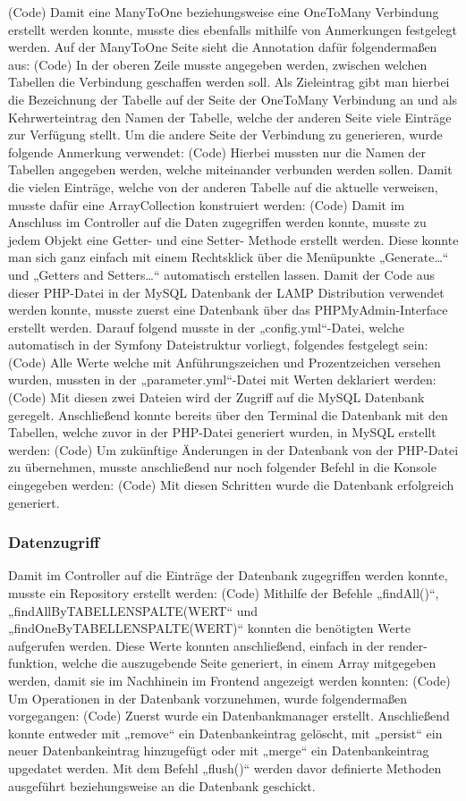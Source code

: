 	(Code)
	Damit eine ManyToOne beziehungsweise eine OneToMany Verbindung erstellt werden konnte, musste dies ebenfalls mithilfe von Anmerkungen festgelegt werden.
	Auf der ManyToOne Seite sieht die Annotation dafür folgendermaßen aus:
	(Code)
	In der oberen Zeile musste angegeben werden, zwischen welchen Tabellen die Verbindung geschaffen werden soll. Als Zieleintrag gibt man hierbei die Bezeichnung der Tabelle auf der Seite der OneToMany Verbindung an und als Kehrwerteintrag den Namen der Tabelle, welche der anderen Seite viele Einträge zur Verfügung stellt.
	Um die andere Seite der Verbindung zu generieren, wurde folgende Anmerkung verwendet:
	(Code)
	Hierbei mussten nur die Namen der Tabellen angegeben werden, welche miteinander verbunden werden sollen. Damit die vielen Einträge, welche von der anderen Tabelle auf die aktuelle verweisen, musste dafür eine ArrayCollection konstruiert werden:
	(Code)
	Damit im Anschluss im Controller auf die Daten zugegriffen werden konnte, musste zu jedem Objekt eine Getter- und eine Setter- Methode erstellt werden. Diese konnte man sich ganz einfach mit einem Rechtsklick über die Menüpunkte „Generate…“ und „Getters and Setters…“ automatisch erstellen lassen.
	Damit der Code aus dieser PHP-Datei in der MySQL Datenbank der LAMP Distribution verwendet werden konnte, musste zuerst eine Datenbank über das PHPMyAdmin-Interface erstellt werden. Darauf folgend musste in der „config.yml“-Datei, welche automatisch in der Symfony Dateistruktur vorliegt, folgendes festgelegt sein:
	(Code)
	Alle Werte welche mit Anführungszeichen und Prozentzeichen versehen wurden, mussten in der „parameter.yml“-Datei mit Werten deklariert werden:
	(Code)
	Mit diesen zwei Dateien wird der Zugriff auf die MySQL Datenbank geregelt.
	Anschließend konnte bereits über den Terminal die Datenbank mit den Tabellen, welche zuvor in der PHP-Datei generiert wurden, in MySQL erstellt werden:
	(Code)
	Um zukünftige Änderungen in der Datenbank von der PHP-Datei zu übernehmen, musste anschließend nur noch folgender Befehl in die Konsole eingegeben werden:
	(Code)
	Mit diesen Schritten wurde die Datenbank erfolgreich generiert.

    \subsubsection{Datenzugriff}

	Damit im Controller auf die Einträge der Datenbank zugegriffen werden konnte, musste ein Repository erstellt werden:
	(Code)
	Mithilfe der Befehle „findAll()“, „findAllByTABELLENSPALTE(WERT“ und „findOneByTABELLENSPALTE(WERT)“ konnten die benötigten Werte aufgerufen werden.
	Diese Werte konnten anschließend, einfach in der render-funktion, welche die auszugebende Seite generiert, in einem Array mitgegeben werden, damit sie im Nachhinein im Frontend angezeigt werden konnten:
	(Code)
	Um Operationen in der Datenbank vorzunehmen, wurde folgendermaßen vorgegangen:
	(Code)
	Zuerst wurde ein Datenbankmanager erstellt. Anschließend konnte entweder mit „remove“ ein Datenbankeintrag gelöscht, mit „persist“ ein neuer Datenbankeintrag hinzugefügt oder mit „merge“ ein Datenbankeintrag upgedatet werden. Mit dem Befehl „flush()“ werden davor definierte Methoden ausgeführt beziehungsweise an die Datenbank geschickt.

